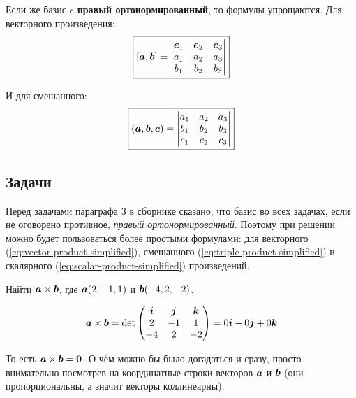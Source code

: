\documentclass[a4paper,12pt]{article}
\begin{document}
  Если же базис $e$ \textbf{правый ортонормированный}, то формулы упрощаются.
  Для векторного произведения:
  \begin{equation}\label{eq:vector-product-simplified}
    \boxed{[\boldsymbol a, \boldsymbol b] = \begin{vmatrix}
      \boldsymbol e_1 & \boldsymbol e_2 & \boldsymbol e_3\\
      a_1 & a_2 & a_3\\
      b_1 & b_2 & b_3
    \end{vmatrix}}
  \end{equation}
  
  И для смешанного:
  \begin{equation}\label{eq:triple-product-simplified}
    \boxed{(\boldsymbol a, \boldsymbol b, \boldsymbol c) = \begin{vmatrix}
      a_1 & a_2 & a_3\\
      b_1 & b_2 & b_3\\
      c_1 & c_2 & c_3
    \end{vmatrix}}
  \end{equation}
  
  
  \subsection{Задачи}
  
  Перед задачами параграфа $3$ в сборнике сказано, что базис во всех задачах, если не оговорено противное, \emph{правый ортонормированный}.
  Поэтому при решении можно будет пользоваться более простыми формулами: для векторного (\ref{eq:vector-product-simplified}), смешанного (\ref{eq:triple-product-simplified}) и скалярного (\ref{eq:scalar-product-simplified}) произведений.
  
  \begin{problem}[3.1(2)]
    Найти $\boldsymbol a \times \boldsymbol b$, где $\boldsymbol a(2, -1, 1)$ и $\boldsymbol b(-4, 2, -2)$.  %
  \end{problem}
  
  \begin{solution}
    \[
      \boldsymbol a \times \boldsymbol b = \det \begin{pmatrix}
        \boldsymbol i & \boldsymbol j & \boldsymbol k\\
        2      & -1     & 1\\
        -4     & 2      & -2
      \end{pmatrix}
      = 0 \boldsymbol i - 0 \boldsymbol j + 0 \boldsymbol k
    \]
    
    То есть $\bds a \hm\times \bds b \hm= \bds 0$.
    О чём можно бы было догадаться и сразу, просто внимательно посмотрев на координатные строки векторов $\boldsymbol a$ и $\boldsymbol b$ (они пропорциональны, а значит векторы коллинеарны).
  \end{solution}
  
\end{document}
